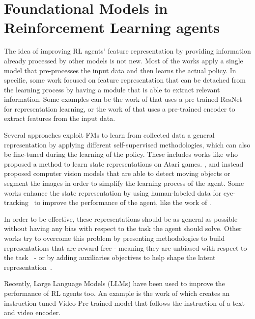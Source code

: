 \section{Foundational Models in Reinforcement Learning agents}\label{sec:fm_rl}
The idea of improving RL agents' feature representation by providing information already processed by other models is not new.
Most of the works apply a single model that pre-processes the input data and then learns the actual policy.
In specific, some work focused on feature representation that can be detached from the learning process by having a module that is able to extract relevant information.
Some examples can be the work of \citet{shah2021rrl} that uses a pre-trained ResNet for representation learning, or the work of \citet{yuan2022pre} that uses a pre-trained encoder to extract features from the input data.

Several approaches exploit FMs to learn from collected data a general representation by applying different self-supervised methodologies, which can also be fine-tuned during the learning of the policy.
These includes works like \citet{anand2019unsupervised} who proposed a method to learn state representations on Atari games.
\citet{kulkarni2019unsupervised}, \citet{montalvo2023exploiting} and \citet{xiao2022masked} instead proposed computer vision models that are able to detect moving objects or segment the images in order to simplify the learning process of the agent.
Some works enhance the state representation by using human-labeled data for eye-tracking~\citep{zhang2020atari} to improve the performance of the agent, like the work of \citet{thammineni2023selective}.

In order to be effective, these representations should be as general as possible without having any bias with respect to the task the agent should solve.
Other works try to overcome this problem by presenting methodologies to build representations that are reward free - meaning they are unbiased with respect to the task~\citep{stooke2021decoupling} - or by adding auxiliaries objectives to help shape the latent representation~\citep{lan2023bootstrapped}.

Recently, Large Language Models (LLMs) have been used to improve the performance of RL agents too.
An example is the work of \citet{lifshitz2024steve} which creates an instruction-tuned Video Pre-trained model that follows the instruction of a text and video encoder.



